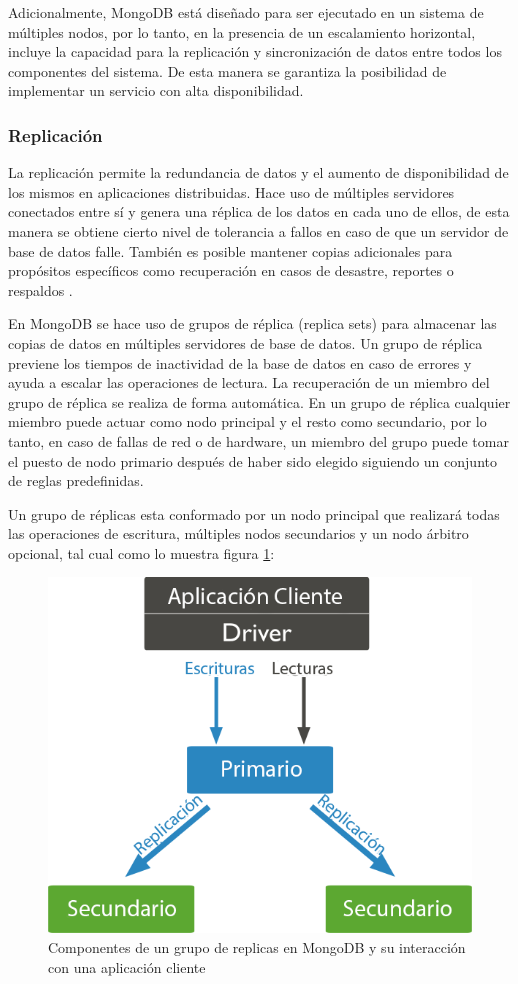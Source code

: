 Adicionalmente, MongoDB \cite{10} está diseñado para ser ejecutado en un sistema de múltiples nodos, por lo tanto,
en la presencia de un escalamiento horizontal, incluye la capacidad para la replicación
y sincronización de datos entre todos los componentes del sistema. De esta manera se garantiza la posibilidad
de implementar un servicio con alta disponibilidad.

\subsubsection{Replicación}

La replicación permite la redundancia de datos y el aumento de disponibilidad de los mismos en aplicaciones distribuidas.
Hace uso de múltiples servidores conectados entre sí y genera una réplica de los datos en cada uno de ellos, de
esta manera se obtiene cierto nivel de tolerancia a fallos en caso de que un servidor de base de datos falle.
También es posible mantener copias adicionales para propósitos específicos como recuperación en casos de desastre,
reportes o respaldos \cite{11}.

En MongoDB se hace uso de grupos de réplica (replica sets) para almacenar las copias de datos en múltiples
servidores de base de datos. Un grupo de réplica previene los tiempos de inactividad de la base de datos
en caso de errores y ayuda a escalar las operaciones de lectura. La recuperación de un miembro del grupo de
réplica se realiza de forma automática. En un grupo de réplica cualquier miembro puede actuar como nodo principal
y el resto como secundario, por lo tanto, en caso de fallas de red o de hardware, un miembro del grupo
puede tomar el puesto de nodo primario después de haber sido elegido siguiendo un conjunto de reglas predefinidas.

Un grupo de réplicas esta conformado por un nodo principal que realizará todas las operaciones de escritura, múltiples nodos
secundarios y un nodo árbitro opcional, tal cual como lo muestra figura \ref{fig:replicas}:

\begin{figure}[H]
	\centering
		\includegraphics[width=.6\textwidth]{figures/replicas}
	\caption{Componentes de un grupo de replicas en MongoDB y su interacción con una aplicación cliente}
	\label{fig:replicas}
\end{figure}

